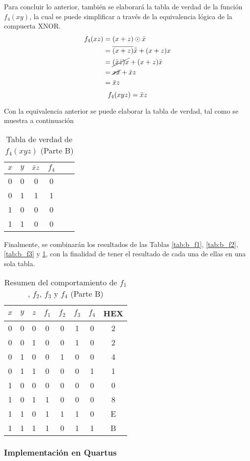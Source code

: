 \documentclass[../procedimientos.tex]{subfiles}
\begin{document}
Para concluir lo anterior, también se elaborará la tabla de verdad de la 
función $f_4(xy)$, la cual se puede simplificar a través de la equivalencia 
lógica de la compuerta XNOR.
\begin{align*}
  f_4(xz) &= (x + z) \odot \bar{x}\\
  &= \overline{(x+z)}\bar{\bar{x}} + (x+z)x\\
  &= \cancel{(\bar{x}\bar{z})x} + (x+z)\bar{x}\\
  &= \cancel{x\bar{x}} + \bar{x}z\\
  &= \bar{x}z
\end{align*}
$$f_4(xyz) = \bar{x}z$$

Con la equivalencia anterior se puede elaborar la tabla de verdad, tal como se 
muestra a continuación
\begin{table}[H]
  \centering
  \begin{tabular}{ccc|cc|c}
    \hline
    $x$ & $y$ & $\bar{x}z$ & $f_4$\\
    \hline
    0 & 0 & 0 & 0\\
    0 & 1 & 1 & 1\\
    1 & 0 & 0 & 0\\
    1 & 1 & 0 & 0\\
    \hline
  \end{tabular}
  \caption{Tabla de verdad de $f_4(xyz)$ (Parte B)}
  \label{tab:b_f4}
\end{table}

Finalmente, se combinarán los resultados de las Tablas \ref{tab:b_f1}, 
\ref{tab:b_f2}, \ref{tab:b_f3} y \ref{tab:b_f4}, con la finalidad de tener el 
resultado de cada una de ellas en una sola tabla.
\begin{table}[H]
  \centering
  \begin{tabular}{ccc|cccc|c}
    \hline
    $x$ & $y$ & $z$ & $f_1$ & $f_2$ & $f_3$ & $f_4$ & HEX\\
    \hline
    0 & 0 & 0 & 0 & 0 & 1 & 0 & 2\\
    0 & 0 & 1 & 0 & 0 & 1 & 0 & 2\\
    0 & 1 & 0 & 0 & 1 & 0 & 0 & 4\\
    0 & 1 & 1 & 0 & 0 & 0 & 1 & 1\\
    1 & 0 & 0 & 0 & 0 & 0 & 0 & 0\\
    1 & 0 & 1 & 1 & 0 & 0 & 0 & 8\\
    1 & 1 & 0 & 1 & 1 & 1 & 0 & E\\
    1 & 1 & 1 & 1 & 0 & 1 & 1 & B\\
    \hline
  \end{tabular}
  \caption{Resumen del comportamiento de $f_1$, $f_2$, $f_3$ y $f_4$ (Parte 
  B)}
  \label{tab:b_summary}
\end{table}


\subsubsection{Implementación en Quartus}
\end{document}
